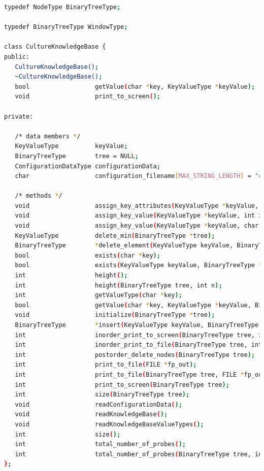\documentclass{CSSRforAfrica}
\begin{document}
\begin{appendices}
\begin{lstlisting}[style=withoutNumbering, language=bash]
typedef NodeType BinaryTreeType;

typedef BinaryTreeType WindowType;

class CultureKnowledgeBase {
public:
   CultureKnowledgeBase();
   ~CultureKnowledgeBase();
   bool                  getValue(char *key, KeyValueType *keyValue);   
   void                  print_to_screen();                                   

private:

   /* data members */
   KeyValueType          keyValue;
   BinaryTreeType        tree = NULL; 
   ConfigurationDataType configurationData;
   char                  configuration_filename[MAX_STRING_LENGTH] = "cultureKnowledgeBaseConfiguration.ini";
   
   /* methods */
   void                  assign_key_attributes(KeyValueType *keyValue, char key[],  int valueType, bool operational);   
   void                  assign_key_value(KeyValueType *keyValue, int integerValue, bool operational);   
   void                  assign_key_value(KeyValueType *keyValue, char *alphanumericValue, bool operational);     
   KeyValueType          delete_min(BinaryTreeType *tree);      
   BinaryTreeType        *delete_element(KeyValueType keyValue, BinaryTreeType *tree);  
   bool                  exists(char *key);   
   bool                  exists(KeyValueType keyValue, BinaryTreeType *tree);  
   int                   height();    
   int                   height(BinaryTreeType tree, int n);  
   int                   getValueType(char *key);  
   bool                  getValue(char *key, KeyValueType *keyValue, BinaryTreeType *tree);   
   void                  initialize(BinaryTreeType *tree);  
   BinaryTreeType        *insert(KeyValueType keyValue, BinaryTreeType *tree, bool update);   
   int                   inorder_print_to_screen(BinaryTreeType tree, int n);  
   int                   inorder_print_to_file(BinaryTreeType tree, int n, FILE *fp_out); 
   int                   postorder_delete_nodes(BinaryTreeType tree); 
   int                   print_to_file(FILE *fp_out);  
   int                   print_to_file(BinaryTreeType tree, FILE *fp_out);  
   int                   print_to_screen(BinaryTreeType tree);      
   int                   size(BinaryTreeType tree);   
   void                  readConfigurationData();  
   void                  readKnowledgeBase();   
   void                  readKnowledgeBaseValueTypes();    
   int                   size(); 
   int                   total_number_of_probes();    
   int                   total_number_of_probes(BinaryTreeType tree, int n);        
};




\end{lstlisting}

 \end{appendices}
\end{document}
